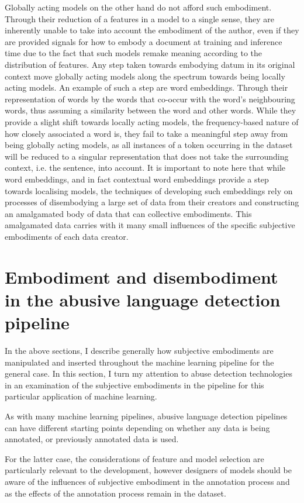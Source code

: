 Globally acting models on the other hand do not afford such embodiment. Through their reduction of a features in a model to a single sense, they are inherently unable to take into account the embodiment of the author, even if they are provided signals for how to embody a document at training and inference time due to the fact that such models remake meaning according to the distribution of features. Any step taken towards embodying datum in its original context move globally acting models along the spectrum towards being locally acting models. An example of such a step are word embeddings. Through their representation of words by the words that co-occur with the word's neighbouring words, thus assuming a similarity between the word and other words. While they provide a slight shift towards locally acting models, the frequency-based nature of how closely associated a word is, they fail to take a meaningful step away from being globally acting models, as all instances of a token occurring in the dataset will be reduced to a singular representation that does not take the surrounding context, i.e. the sentence, into account.
It is important to note here that while word embeddings, and in fact contextual word embeddings provide a step towards localising models, the techniques of developing such embeddings rely on processes of disembodying a large set of data from their creators and constructing an amalgamated body of data that can collective embodiments. This amalgamated data carries with it many small influences of the specific subjective embodiments of each data creator.

\section{Embodiment and disembodiment in the abusive language detection pipeline}
In the above sections, I describe generally how subjective embodiments are manipulated and inserted throughout the machine learning pipeline for the general case. In this section, I turn my attention to abuse detection technologies in an examination of the subjective embodiments in the pipeline for this particular application of machine learning.\vspace{5mm}

As with many machine learning pipelines, abusive language detection pipelines can have different starting points depending on whether any data is being annotated, or previously annotated data is used.

For the latter case, the considerations of feature and model selection  are particularly relevant to the development, however designers of models should be aware of the influences of subjective embodiment in the annotation process and as the effects of the annotation process remain in the dataset.\vspace{5mm}

